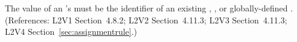 The value of an \AssignmentRule's  must be the identifier
of an existing \Compartment, \Species, or globally-defined \Parameter.
(References: L2V1 Section~4.8.2; L2V2 Section~4.11.3; L2V3
Section~4.11.3; L2V4 Section~\ref{sec:assignmentrule}.)

